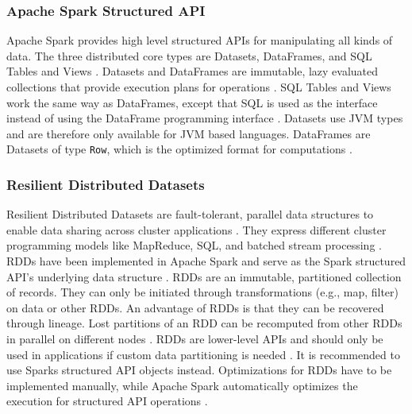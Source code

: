\subsubsection{Apache Spark Structured API}
Apache Spark provides high level structured APIs for manipulating all kinds of data. The three distributed core types are Datasets, DataFrames, and SQL Tables and Views \cite{Chambers2018Spark}.
Datasets and DataFrames are immutable, lazy evaluated collections that provide execution plans for operations \cite{Chambers2018Spark}. SQL Tables and Views work the same way as DataFrames, except that SQL is used as the interface instead of using the DataFrame programming interface \cite{Chambers2018Spark}.
Datasets use JVM types and are therefore only available for JVM based languages. DataFrames are Datasets of type \texttt{Row}, which is the optimized format for computations \cite{Chambers2018Spark}.


\subsubsection{Resilient Distributed Datasets}
Resilient Distributed Datasets are fault-tolerant, parallel data structures to enable data sharing across cluster applications \cite{Zaharia2012RDDs}. They express different cluster programming models like MapReduce, SQL, and batched stream processing \cite{Zaharia2012RDDs}. RDDs have been implemented in Apache Spark and serve as the Spark structured API's underlying data structure \cite{Zaharia2012RDDs}.
RDDs are an immutable, partitioned collection of records. They can only be initiated through transformations (e.g., map, filter) on data or other RDDs.
An advantage of RDDs is that they can be recovered through lineage. Lost partitions of an RDD can be recomputed from other RDDs in parallel on different nodes \cite{Zaharia2012RDDs}. 
RDDs are lower-level APIs and should only be used in applications if custom data partitioning is needed \cite{Chambers2018Spark}. It is recommended to use Sparks structured API objects instead. Optimizations for RDDs have to be implemented manually, while Apache Spark automatically optimizes the execution for structured API operations \cite{Chambers2018Spark}.


